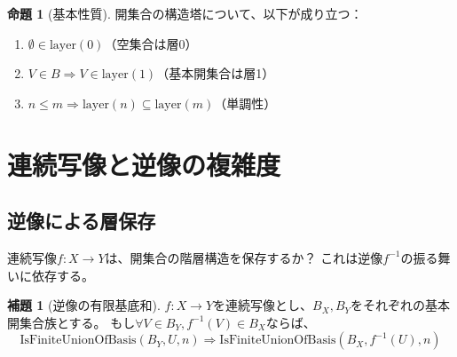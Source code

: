 \documentclass[a4paper,12pt]{ltjsarticle}
\theoremstyle{definition}
\newtheorem{lemma}[definition]{補題}
\newtheorem{proposition}[definition]{命題}
\begin{document}
\begin{mainbox}[title=開集合階層の図式]
\begin{center}
\end{center}
\end{mainbox}

\begin{proposition}[基本性質]
開集合の構造塔について、以下が成り立つ：
\begin{enumerate}
  \item $\emptyset \in \mathrm{layer}(0)$（空集合は層0）
  \item $V \in B \Rightarrow V \in \mathrm{layer}(1)$（基本開集合は層1）
  \item $n \leq m \Rightarrow \mathrm{layer}(n) \subseteq \mathrm{layer}(m)$（単調性）
\end{enumerate}
\end{proposition}

\section{連続写像と逆像の複雑度}

\subsection{逆像による層保存}

連続写像$f: X \to Y$は、開集合の階層構造を保存するか？
これは逆像$f^{-1}$の振る舞いに依存する。

\begin{lemma}[逆像の有限基底和]\label{lem:preimage-basis}
$f: X \to Y$を連続写像とし、$B_X, B_Y$をそれぞれの基本開集合族とする。
もし$\forall V \in B_Y, f^{-1}(V) \in B_X$ならば、
\[
\mathrm{IsFiniteUnionOfBasis}(B_Y, U, n) \Rightarrow \mathrm{IsFiniteUnionOfBasis}(B_X, f^{-1}(U), n)
\]
\end{lemma}
\end{document}
